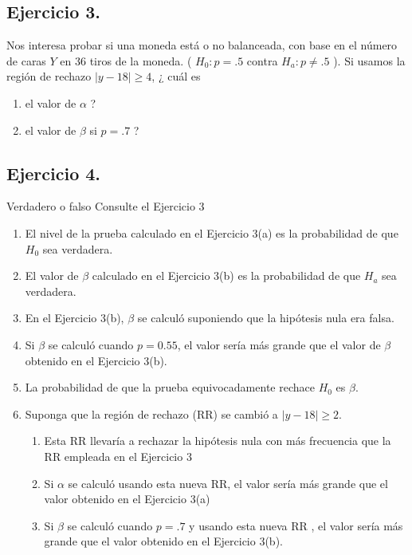\documentclass[
]{article}
\providecommand{\tightlist}{%
  \setlength{\itemsep}{0pt}\setlength{\parskip}{0pt}}
\begin{document}
\subsection{Ejercicio 3.}\label{ejercicio-3.}

Nos interesa probar si una moneda está o no balanceada, con base en el número de caras \(Y\) en 36 tiros de la moneda. ( \(H_{0}: p=.5\) contra \(H_{a}: p \neq .5\) ). Si usamos la región de rechazo \(|y-18| \geq 4\), \(¿\) cuál es

\begin{enumerate}
\def\labelenumi{\alph{enumi}.}
\tightlist
\item
  el valor de \(\alpha\) ?
\item
  el valor de \(\beta\) si \(p=.7\) ?
\end{enumerate}

\subsection{Ejercicio 4.}\label{ejercicio-4.}

Verdadero o falso Consulte el Ejercicio 3

\begin{enumerate}
\def\labelenumi{\alph{enumi}.}
\item
  El nivel de la prueba calculado en el Ejercicio 3(a) es la probabilidad de que \(H_{0}\) sea verdadera.
\item
  El valor de \(\beta\) calculado en el Ejercicio 3(b) es la probabilidad de que \(H_{a}\) sea verdadera.
\item
  En el Ejercicio 3(b), \(\beta\) se calculó suponiendo que la hipótesis nula era falsa.
\item
  Si \(\beta\) se calculó cuando \(p=0.55\), el valor sería más grande que el valor de \(\beta\) obtenido en el Ejercicio 3(b).
\item
  La probabilidad de que la prueba equivocadamente rechace \(H_{0}\) es \(\beta\).
\item
  Suponga que la región de rechazo (RR) se cambió a \(|y-18| \geq 2\).

  \begin{enumerate}
  \def\labelenumii{\arabic{enumii}.}
  \tightlist
  \item
    Esta RR llevaría a rechazar la hipótesis nula con más frecuencia que la RR empleada en el Ejercicio 3
  \item
    Si \(\alpha\) se calculó usando esta nueva RR, el valor sería más grande que el valor obtenido en el Ejercicio 3(a)
  \item
    Si \(\beta\) se calculó cuando \(p=.7\) y usando esta nueva RR , el valor sería más grande que el valor obtenido en el Ejercicio 3(b).
  \end{enumerate}
\end{enumerate}
\end{document}

